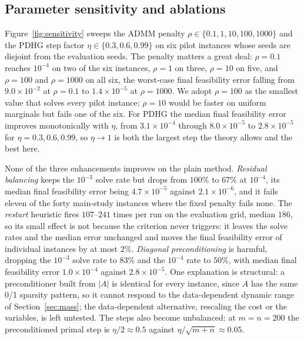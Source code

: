 \documentclass{article}
\newcommand{\Tol}[1]{10^{-#1}}
\begin{document}
\begin{table}[t]
\centering
\caption{Does the regularised baseline improve if $\varepsilon$ is pushed two orders of
magnitude below the grid, and does warm-started continuation help? Both rows of each
pair were given the \emph{same} total iteration budget, so the comparison isolates the
schedule. Medians over the forty grid instances; ``certified@$\Tol{4}$'' is the
two-sided criterion of Section~\ref{sec:formulation}. The $\varepsilon$-sweep behind
the bias is in \texttt{tab\_sinkhorn.tex}.}
\label{tab:sinkhorncont}
\small

\end{table}

\subsection{Parameter sensitivity and ablations}
\label{sec:sensitivity}

Figure~\ref{fig:sensitivity} sweeps the ADMM penalty
$\rho\in\{0.1,1,10,100,1000\}$ and the PDHG step factor $\eta\in\{0.3,0.6,0.99\}$ on six
pilot instances whose seeds are disjoint from the evaluation seeds. The penalty matters a
great deal: $\rho=0.1$ reaches $\Tol{4}$ on two of the six instances, $\rho=1$ on three,
$\rho=10$ on five, and $\rho=100$ and $\rho=1000$ on all six, the worst-case final
feasibility error falling from $9.0\times\Tol{2}$ at $\rho=0.1$ to $1.4\times\Tol{5}$ at
$\rho=1000$. We adopt $\rho=100$ as the smallest value that solves every pilot instance;
$\rho=10$ would be faster on uniform marginals but fails one of the six. For PDHG the
median final feasibility error improves monotonically with $\eta$, from
$3.1\times\Tol{4}$ through $8.0\times\Tol{5}$ to $2.8\times\Tol{5}$ for $\eta=0.3,0.6,0.99$,
so $\eta\to1$ is both the largest step the theory allows and the best here.

None of the three enhancements improves on the plain method. \emph{Residual balancing}
keeps the $\Tol{3}$ solve rate but drops from $100\%$ to $67\%$ at $\Tol{4}$, its median
final feasibility error being $4.7\times\Tol{5}$ against $2.1\times\Tol{6}$, and it fails
eleven of the forty main-study instances where the fixed penalty fails none. The
\emph{restart} heuristic fires $107$--$241$ times per run on the evaluation grid, median
$186$, so its small effect is not because the criterion never triggers: it leaves the solve
rates and the median error unchanged and moves the final feasibility error of individual
instances by at most $2\%$. \emph{Diagonal preconditioning} is harmful, dropping the
$\Tol{3}$ solve rate to $83\%$ and the $\Tol{4}$ rate to $50\%$, with median final
feasibility error $1.0\times\Tol{4}$ against $2.8\times\Tol{5}$. One explanation is structural: a preconditioner built from $|A|$ is identical for every
instance, since $A$ has the same 0/1 sparsity pattern, so it cannot respond to the
data-dependent dynamic range of Section~\ref{sec:mass}; the data-dependent alternative,
rescaling the cost or the variables, is left untested. The steps also become unbalanced: at
$m=n=200$ the preconditioned primal step is $\eta/2\approx0.5$ against
$\eta/\sqrt{m+n}\approx0.05$.
\end{document}
